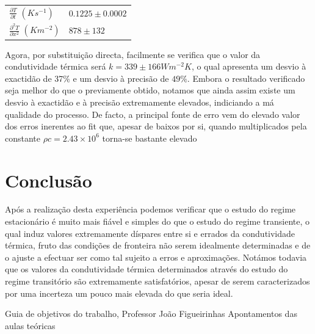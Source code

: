 \documentclass[8pt]{extarticle}
\begin{document}
\begin{multicols}{2}
{\small
\begin{center}
\begin{tabular}{ x{3cm} x{3cm}} 
\hline \hline
$\frac{\partial T}{\partial t}$ $(Ks^{-1})$ & $0.1225\pm0.0002$ \tabularnewline 
$\frac{\partial^2 T}{\partial x^2}$ $(Km^{-2})$ & $878\pm132$ \tabularnewline
\hline \hline
\end{tabular}
\par{}
\end{center}
}

\par Agora, por substituição directa, facilmente se verifica que o valor da condutividade térmica será $k=339\pm166 Wm^{-2}K$, o qual apresenta um desvio à exactidão de 37$\%$ e um desvio à precisão de $49\%$. Embora o resultado verificado seja melhor do que o previamente obtido, notamos que ainda assim existe um desvio à exactidão e à precisão extremamente elevados, indiciando a má qualidade do processo. De facto, a principal fonte de erro vem do elevado valor dos erros inerentes ao fit que, apesar de baixos por si, quando multiplicados pela constante $\rho c=2.43\times10^6$ torna-se bastante elevado

\section{Conclusão}
\par Após a realização desta experiência podemos verificar que o estudo do regime estacionário é muito mais fiável e simples do que o estudo do regime transiente, o qual induz valores extremamente díspares entre si e errados da condutividade térmica, fruto das condições de fronteira não serem idealmente determinadas e de o ajuste a efectuar ser como tal sujeito a erros e aproximações. Notámos todavia que os valores da condutividade térmica determinados através do estudo do regime transitório são extremamente satisfatórios, apesar de serem caracterizados por uma incerteza um pouco mais elevada do que seria ideal. 

\begin{thebibliography}{9}

 Guia de objetivos do trabalho, Professor João Figueirinhas
 Apontamentos das aulas teóricas

\end{thebibliography}

\end{multicols}
 
\end{document}
